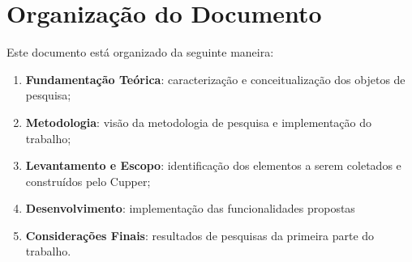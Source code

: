 \section{Organização do Documento}
\label{sec:org}

Este documento está organizado da seguinte maneira:

\begin{enumerate}
  \item \textbf{Fundamentação Teórica}: caracterização e conceitualização dos
    objetos de pesquisa;
  \item \textbf{Metodologia}: visão da metodologia de pesquisa e implementação
    do trabalho;
  \item \textbf{Levantamento e Escopo}: identificação dos elementos a serem coletados
    e construídos pelo Cupper;
  \item \textbf{Desenvolvimento}: implementação das funcionalidades propostas
  \item \textbf{Considerações Finais}: resultados de pesquisas da primeira
    parte do trabalho.
\end{enumerate}

